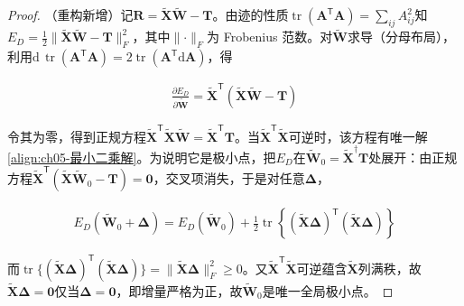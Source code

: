 \documentclass[../../main.tex]{subfiles}
\begin{document}
\begin{proof}
（重构新增）记$\boldsymbol{R}=\tilde{\boldsymbol{X}}\tilde{\boldsymbol{W}}-\boldsymbol{T}$。由迹的性质$\operatorname{tr}(\boldsymbol{A}^{\mathsf{T}}\boldsymbol{A})=\sum_{ij}A_{ij}^{2}$知$E_D=\frac{1}{2}\lVert\tilde{\boldsymbol{X}}\tilde{\boldsymbol{W}}-\boldsymbol{T}\rVert_F^{2}$，其中$\lVert\cdot\rVert_F$为 Frobenius 范数。对$\tilde{\boldsymbol{W}}$求导（分母布局），利用$\mathrm{d}\,\operatorname{tr}(\boldsymbol{A}^{\mathsf{T}}\boldsymbol{A})=2\operatorname{tr}(\boldsymbol{A}^{\mathsf{T}}\mathrm{d}\boldsymbol{A})$，得

\begin{align}
  \frac{\partial E_D}{\partial\tilde{\boldsymbol{W}}}=\tilde{\boldsymbol{X}}^{\mathsf{T}}(\tilde{\boldsymbol{X}}\tilde{\boldsymbol{W}}-\boldsymbol{T})
\end{align}

令其为零，得到正规方程$\tilde{\boldsymbol{X}}^{\mathsf{T}}\tilde{\boldsymbol{X}}\tilde{\boldsymbol{W}}=\tilde{\boldsymbol{X}}^{\mathsf{T}}\boldsymbol{T}$。当$\tilde{\boldsymbol{X}}^{\mathsf{T}}\tilde{\boldsymbol{X}}$可逆时，该方程有唯一解\eqref{align:ch05-最小二乘解}。为说明它是极小点，把$E_D$在$\tilde{\boldsymbol{W}}_0=\tilde{\boldsymbol{X}}^{\dagger}\boldsymbol{T}$处展开：由正规方程$\tilde{\boldsymbol{X}}^{\mathsf{T}}(\tilde{\boldsymbol{X}}\tilde{\boldsymbol{W}}_0-\boldsymbol{T})=\boldsymbol{0}$，交叉项消失，于是对任意$\boldsymbol{\Delta}$，

\begin{align}
  E_D(\tilde{\boldsymbol{W}}_0+\boldsymbol{\Delta})=E_D(\tilde{\boldsymbol{W}}_0)+\frac{1}{2}\operatorname{tr}\left\{(\tilde{\boldsymbol{X}}\boldsymbol{\Delta})^{\mathsf{T}}(\tilde{\boldsymbol{X}}\boldsymbol{\Delta})\right\}
\end{align}

而$\operatorname{tr}\{(\tilde{\boldsymbol{X}}\boldsymbol{\Delta})^{\mathsf{T}}(\tilde{\boldsymbol{X}}\boldsymbol{\Delta})\}=\lVert\tilde{\boldsymbol{X}}\boldsymbol{\Delta}\rVert_F^{2}\geqslant 0$。又$\tilde{\boldsymbol{X}}^{\mathsf{T}}\tilde{\boldsymbol{X}}$可逆蕴含$\tilde{\boldsymbol{X}}$列满秩，故$\tilde{\boldsymbol{X}}\boldsymbol{\Delta}=\boldsymbol{0}$仅当$\boldsymbol{\Delta}=\boldsymbol{0}$，即增量严格为正，故$\tilde{\boldsymbol{W}}_0$是唯一全局极小点。
\end{proof}
\end{document}
